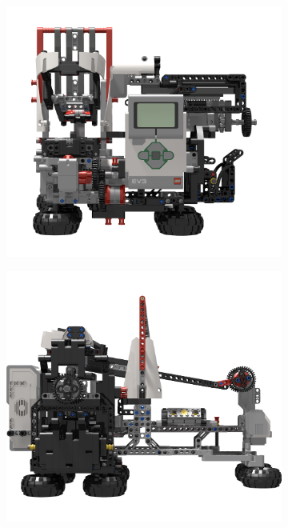 \documentclass{report}
\begin{document}
\begin{figure}[H]
\begin{subfigure}[b]{0.275\textwidth}
    		\includegraphics[width=\textwidth]{Resources/Images/rdrMkIIElevation2.png}
    		\caption{}
    		\label{fig:rdrMkIIElevation2}
    	\end{subfigure}
    	\hspace{10mm}
    	\begin{subfigure}[b]{0.275\textwidth}
    		\includegraphics[width=\textwidth]{Resources/Images/rdrMkIIElevation3.png}

\end{subfigure}
\end{figure}
\end{document}
